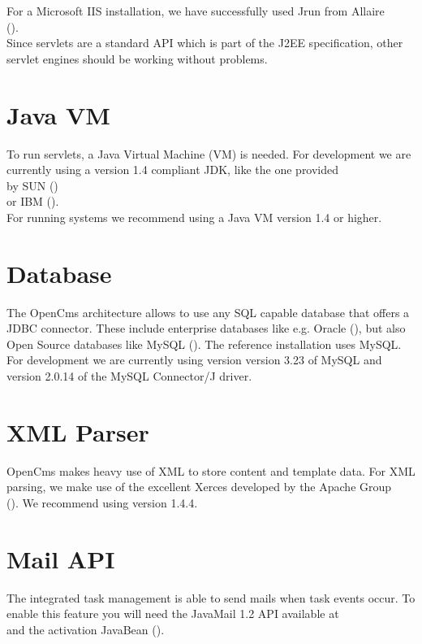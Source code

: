 For a Microsoft IIS installation, we have successfully used Jrun from Allaire \\
().\\
Since servlets are a standard API which is part of the J2EE specification,
other servlet engines should be working without problems.

\section{Java VM}
To run servlets, a Java Virtual Machine (VM) is needed. For development we are currently using
a version 1.4 compliant JDK, like the one provided \\
by SUN ()\\
or IBM ().\\
For running systems we recommend using a Java VM version 1.4 or higher.

\section{Database}
The OpenCms architecture allows to use any SQL capable database that offers a JDBC connector.
These include enterprise databases like e.g. Oracle (),
but also Open Source databases like MySQL ().
The reference installation uses MySQL. For development we are currently using version version 3.23 of 
MySQL and version 2.0.14 of the MySQL Connector/J driver.

\section{XML Parser}
OpenCms makes heavy use of XML to store content and template data. For XML parsing, we make use of
the excellent Xerces developed by the Apache Group\\
().
We recommend using version 1.4.4.

\section{Mail API}
The integrated task management is able to send mails when task events occur.
To enable this feature you will need the JavaMail 1.2 API available at \\
 and the activation Java\-Bean
().

